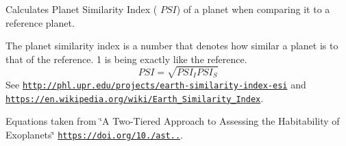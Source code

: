 Calculates Planet Similarity Index ( $PSI$) of a planet when comparing it to a reference planet. 

The planet similarity index is a number that denotes how similar a planet is to that of the reference. 1 is being exactly like the reference. \[PSI=\sqrt{PSI_I PSI_S}\] See \href{http://phl.upr.edu/projects/earth-similarity-index-esi}{\tt http\+://phl.\+upr.\+edu/projects/earth-\/similarity-\/index-\/esi} and \href{https://en.wikipedia.org/wiki/Earth_Similarity_Index}{\tt https\+://en.\+wikipedia.\+org/wiki/\+Earth\+\_\+\+Similarity\+\_\+\+Index}.

Equations taken from \char`\"{}\+A Two-\/\+Tiered Approach to Assessing the Habitability of Exoplanets\char`\"{} \href{https://doi.org/10.1089/ast.2010.0592}{\tt https\+://doi.\+org/10./ast..}.


